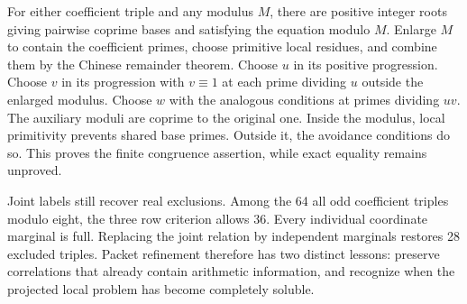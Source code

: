 For either coefficient triple and any modulus $M$, there are positive integer roots giving pairwise coprime bases and satisfying the equation modulo $M$. Enlarge $M$ to contain the coefficient primes, choose primitive local residues, and combine them by the Chinese remainder theorem. Choose $u$ in its positive progression. Choose $v$ in its progression with $v\equiv1$ at each prime dividing $u$ outside the enlarged modulus. Choose $w$ with the analogous conditions at primes dividing $uv$. The auxiliary moduli are coprime to the original one. Inside the modulus, local primitivity prevents shared base primes. Outside it, the avoidance conditions do so. This proves the finite congruence assertion, while exact equality remains unproved.

Joint labels still recover real exclusions. Among the 64 all odd coefficient triples modulo eight, the three row criterion allows 36. Every individual coordinate marginal is full. Replacing the joint relation by independent marginals restores 28 excluded triples. Packet refinement therefore has two distinct lessons: preserve correlations that already contain arithmetic information, and recognize when the projected local problem has become completely soluble.
